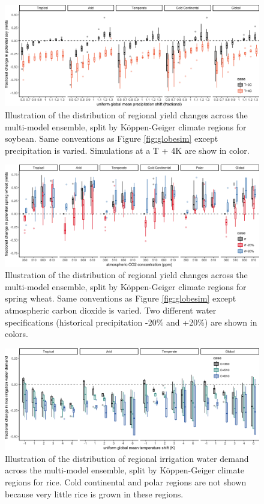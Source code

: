 \documentclass[gmd, manuscript]{copernicus} %
\begin{document}
\begin{figure}[ht]
\centering
   \includegraphics[width=15cm]{figures/soy_sim_CG_W.png}
   \caption{Illustration of the distribution of regional yield changes across the multi-model ensemble, split by K\"{o}ppen-Geiger climate regions for soybean. Same conventions as Figure \ref{fig:globesim} except precipitation is varied. Simulations at a T + 4K are show in color.}
   \label{fig:globesim_W}
\end{figure}

\begin{figure}[ht]
\centering
   \includegraphics[width=15cm]{figures/swh_sim_CG_C.png}
   \caption{Illustration of the distribution of regional yield changes across the multi-model ensemble, split by K\"{o}ppen-Geiger climate regions for spring wheat. Same conventions as Figure \ref{fig:globesim} except atmospheric carbon dioxide is varied. Two different water specifications (historical precipitation -20\% and +20\%) are shown in colors.}
   \label{fig:globesim_C}
\end{figure}

\begin{figure}[ht]
\centering
   \includegraphics[width=14cm]{figures/rice_sim_CG_irrwat.png}
   \caption{Illustration of the distribution of regional irrigation water demand across the multi-model ensemble, split by K\"{o}ppen-Geiger climate regions for rice. Cold continental and polar regions are not shown because very little rice is grown in these regions.}
   \label{fig:globesim_IRR}
\end{figure}
\end{document}
